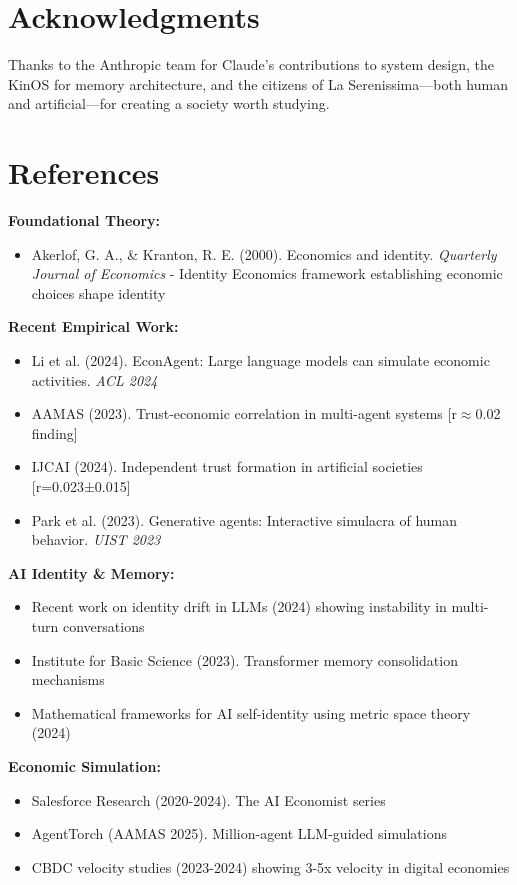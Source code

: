 \documentclass[11pt,a4paper]{article}
\begin{document}
\section*{Acknowledgments}

Thanks to the Anthropic team for Claude's contributions to system design, the KinOS for memory architecture, and the citizens of La Serenissima---both human and artificial---for creating a society worth studying.

\section*{References}

\textbf{Foundational Theory:}
\begin{itemize}
\item Akerlof, G. A., \& Kranton, R. E. (2000). Economics and identity. \emph{Quarterly Journal of Economics} - Identity Economics framework establishing economic choices shape identity
\end{itemize}

\textbf{Recent Empirical Work:}
\begin{itemize}
\item Li et al. (2024). EconAgent: Large language models can simulate economic activities. \emph{ACL 2024}
\item AAMAS (2023). Trust-economic correlation in multi-agent systems [r$\approx$0.02 finding]
\item IJCAI (2024). Independent trust formation in artificial societies [r=0.023±0.015]
\item Park et al. (2023). Generative agents: Interactive simulacra of human behavior. \emph{UIST 2023}
\end{itemize}

\textbf{AI Identity \& Memory:}
\begin{itemize}
\item Recent work on identity drift in LLMs (2024) showing instability in multi-turn conversations
\item Institute for Basic Science (2023). Transformer memory consolidation mechanisms
\item Mathematical frameworks for AI self-identity using metric space theory (2024)
\end{itemize}

\textbf{Economic Simulation:}
\begin{itemize}
\item Salesforce Research (2020-2024). The AI Economist series
\item AgentTorch (AAMAS 2025). Million-agent LLM-guided simulations
\item CBDC velocity studies (2023-2024) showing 3-5x velocity in digital economies
\end{itemize}
\end{document}
